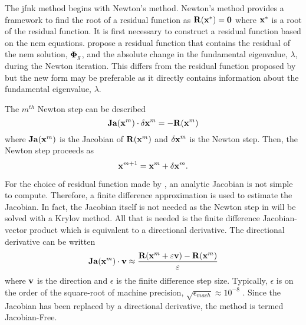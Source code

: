     The \gls{jfnk} method begins with Newton's method. Newton's method provides
    a framework to find the root of a residual function as $\mathbf{R}(\mathbf{x}^*) =
    \mathbf{0}$ where $\mathbf{x}^*$ is a root of the residual function. It is first
    necessary to construct a residual function based on the \gls{nem} equations.
    \citeauthor{qe2paper} propose a residual function that contains the residual
    of  the \gls{nem} solution, $\mathbf{\Phi}_g$, and the absolute change in the
    fundamental eigenvalue, $\lambda$, during the Newton iteration. This differs
    from the residual function proposed by \citeauthor{gill_azmy} but the new
    form may be preferable as it directly contains information about the
    fundamental eigenvalue, $\lambda$.
    
    The $m^{th}$ Newton step can be described 
    \begin{equation}
      \label{eq:newton_step}
      \mathbf{Ja} (\mathbf{x}^m) \cdot \delta\mathbf{x}^m = - \mathbf{R}(\mathbf{x}^m)
    \end{equation}
    where $\mathbf{Ja}(\mathbf{x}^m)$ is the Jacobian of $\mathbf{R}(\mathbf{x}^m)$ and 
    $\delta\mathbf{x}^m$ is the Newton step. Then, the Newton step proceeds as
    \begin{equation}
      \mathbf{x}^{m+1} = \mathbf{x}^{m} + \delta\mathbf{x}^{m}.
    \end{equation}

    For the choice of residual function made by \citeauthor{qe2paper}, an 
    analytic Jacobian is not simple to compute. Therefore, a finite difference
    approximation is used to estimate the Jacobian. In fact, the Jacobian itself
    is not needed as the Newton step in  will be solved
    with a Krylov method. All that is needed is the finite difference
    Jacobian-vector product which is equivalent to a directional derivative. The
    directional derivative can be written
    \begin{equation}
      \label{eq:dirder}
      \mathbf{Ja}(\mathbf{x}^m) \cdot \mathbf{v} \approx \frac{\mathbf{R}(\mathbf{x}^m + \varepsilon \mathbf{v}) - 
        \mathbf{R}(\mathbf{x}^m)}{\varepsilon}
    \end{equation}
    where $\mathbf{v}$ is the direction and $\epsilon$ is the finite difference step
    size. Typically, $\epsilon$ is on the order of the square-root of machine
    precision, $\sqrt{\epsilon_{mach}} \approx 10^{-8}$
    \cite{qe2paper,gill_azmy,textbookkelley}. Since the Jacobian has been
    replaced by a directional derivative, the method is termed Jacobian-Free.


